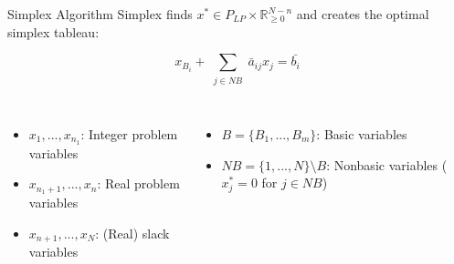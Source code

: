 \begin{frame}{Simplex Algorithm}
Simplex finds $x^* \in P_{LP} \times \mathbb{R}_{\geq 0}^{N-n}$ and creates the optimal simplex tableau:
\begin{center}
\begin{minipage}{0.8\textwidth}
	\begin{tcolorbox}[colback=white, title={$i-$th row in the simplex tableau}]
    \begin{equation*}
    	x_{B_i} + \sum\limits_{\substack{j \in NB}} \bar{a}_{ij} x_j = \bar{b_i}
    \end{equation*}
    \end{tcolorbox}
\end{minipage}
\end{center}
\begin{columns}
\begin{itemize}
\item $x_1,...,x_{n_1}$: Integer problem variables
\item $x_{n_1+1},...,x_n$: Real problem variables
\item $x_{n+1},...,x_N$: (Real) slack variables
\end{itemize}

\begin{itemize}
\item $B=\{B_1,...,B_m\}$: Basic variables
\item $NB = \{1,...,N\} \setminus B$: Nonbasic variables ($x_j^*=0$ for $j \in NB$)
\end{itemize}
\end{columns}
\end{frame}

